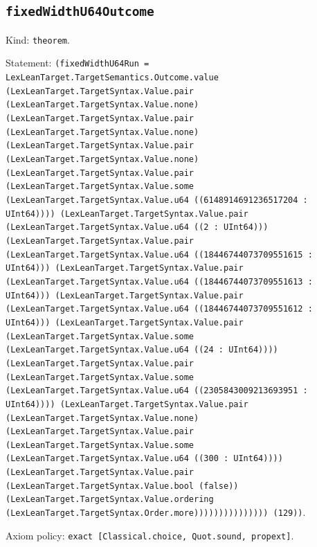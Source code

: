 \documentclass[11pt]{article}
\begin{document}
\subsection*{\texttt{fixedWidthU64Outcome}}
\noindent Kind: \texttt{theorem}.\par
\noindent Statement: \texttt{(fixedWidthU64Run = LexLeanTarget.TargetSemantics.Outcome.value (LexLeanTarget.TargetSyntax.Value.pair (LexLeanTarget.TargetSyntax.Value.none) (LexLeanTarget.TargetSyntax.Value.pair (LexLeanTarget.TargetSyntax.Value.none) (LexLeanTarget.TargetSyntax.Value.pair (LexLeanTarget.TargetSyntax.Value.none) (LexLeanTarget.TargetSyntax.Value.pair (LexLeanTarget.TargetSyntax.Value.some (LexLeanTarget.TargetSyntax.Value.u64 ((6148914691236517204 : UInt64)))) (LexLeanTarget.TargetSyntax.Value.pair (LexLeanTarget.TargetSyntax.Value.u64 ((2 : UInt64))) (LexLeanTarget.TargetSyntax.Value.pair (LexLeanTarget.TargetSyntax.Value.u64 ((18446744073709551615 : UInt64))) (LexLeanTarget.TargetSyntax.Value.pair (LexLeanTarget.TargetSyntax.Value.u64 ((18446744073709551613 : UInt64))) (LexLeanTarget.TargetSyntax.Value.pair (LexLeanTarget.TargetSyntax.Value.u64 ((18446744073709551612 : UInt64))) (LexLeanTarget.TargetSyntax.Value.pair (LexLeanTarget.TargetSyntax.Value.some (LexLeanTarget.TargetSyntax.Value.u64 ((24 : UInt64)))) (LexLeanTarget.TargetSyntax.Value.pair (LexLeanTarget.TargetSyntax.Value.some (LexLeanTarget.TargetSyntax.Value.u64 ((2305843009213693951 : UInt64)))) (LexLeanTarget.TargetSyntax.Value.pair (LexLeanTarget.TargetSyntax.Value.none) (LexLeanTarget.TargetSyntax.Value.pair (LexLeanTarget.TargetSyntax.Value.some (LexLeanTarget.TargetSyntax.Value.u64 ((300 : UInt64)))) (LexLeanTarget.TargetSyntax.Value.pair (LexLeanTarget.TargetSyntax.Value.bool (false)) (LexLeanTarget.TargetSyntax.Value.ordering (LexLeanTarget.TargetSyntax.Order.more))))))))))))))) (129))}.\par
\noindent Axiom policy: \texttt{exact [Classical.choice, Quot.sound, propext]}.\par
\end{document}
